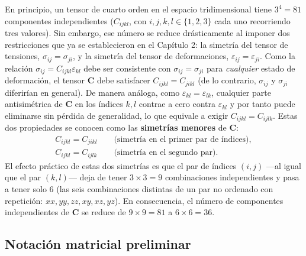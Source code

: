 En principio, un tensor de cuarto orden en el espacio tridimensional tiene $3^4=81$ componentes independientes ($C_{ijkl}$, con $i,j,k,l\in\{1,2,3\}$ cada uno recorriendo tres valores). Sin embargo, ese número se reduce drásticamente al imponer dos restricciones que ya se establecieron en el Capítulo 2: la simetría del tensor de tensiones, $\sigma_{ij}=\sigma_{ji}$, y la simetría del tensor de deformaciones, $\varepsilon_{ij}=\varepsilon_{ji}$. Como la relación $\sigma_{ij}=C_{ijkl}\varepsilon_{kl}$ debe ser consistente con $\sigma_{ij}=\sigma_{ji}$ para \emph{cualquier} estado de deformación, el tensor $\bm C$ debe satisfacer $C_{ijkl}=C_{jikl}$ (de lo contrario, $\sigma_{ij}$ y $\sigma_{ji}$ diferirían en general). De manera análoga, como $\varepsilon_{kl}=\varepsilon_{lk}$, cualquier parte antisimétrica de $\bm C$ en los índices $k,l$ contrae a cero contra $\varepsilon_{kl}$ y por tanto puede eliminarse sin pérdida de generalidad, lo que equivale a exigir $C_{ijkl}=C_{ijlk}$. Estas dos propiedades se conocen como las \textbf{simetrías menores} de $\bm C$:
\[
\begin{gathered}
C_{ijkl} = C_{jikl} \qquad \text{(simetría en el primer par de índices)}, \\[4pt]
C_{ijkl} = C_{ijlk} \qquad \text{(simetría en el segundo par)}.
\end{gathered}
\]
El efecto práctico de estas dos simetrías es que el par de índices $(i,j)$ —al igual que el par $(k,l)$— deja de tener $3\times 3=9$ combinaciones independientes y pasa a tener solo $6$ (las seis combinaciones distintas de un par no ordenado con repetición: $xx,yy,zz,xy,xz,yz$). En consecuencia, el número de componentes independientes de $\bm C$ se reduce de $9\times 9=81$ a $6\times 6=36$.

\subsection{Notación matricial preliminar}

